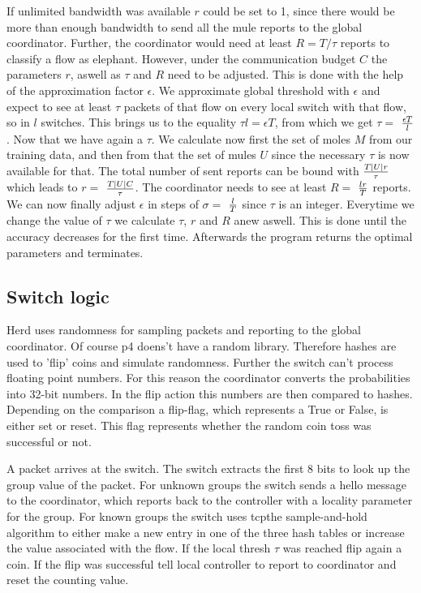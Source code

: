 \documentclass[11pt,oneside,a4paper]{article}
\begin{document}
If unlimited bandwidth was available $r$ could be set to 1, since there would be more than enough bandwidth to send all the mule reports to the global coordinator. Further, the coordinator would need at least $R = T/\tau$ reports to classify a flow as elephant. However, under the communication budget $C$ the parameters $r$, aswell as $\tau$ and $R$ need to be adjusted. This is done with the help of the approximation factor $\epsilon$. We approximate global threshold with $\epsilon$ and expect to see at least $\tau$ packets of that flow on every local switch with that flow, so in $l$ switches. This brings us to the equality $\tau l = \epsilon T$, from which we get $\tau =$ $\epsilon T\over l$. Now that we have again a $\tau$. We calculate now first the set of moles $M$ from our training data, and then from that the set of mules $U$ since the necessary $\tau$ is now available for that. The total number of sent reports can be bound with $T|U|r\over \tau$ which leads to $r =$ $T|U|C\over \tau$. The coordinator needs to see at least $R =$ $lr\over T$ reports. We can now finally adjust $\epsilon$ in steps of $\sigma =$ $l\over T$ since $\tau$ is an integer. Everytime we change the value of $\tau$ we calculate $\tau$, $r$ and $R$ anew aswell. This is done until the accuracy decreases for the first time. Afterwards the program returns the optimal parameters and terminates.

\subsection{Switch logic} \label{switch}
Herd uses randomness for sampling packets and reporting to the global coordinator. Of course p4 doens't have a random library. Therefore hashes are used to 'flip' coins and simulate randomness. Further the switch can't process floating point numbers. For this reason the coordinator converts the probabilities into 32-bit numbers. In the flip action this numbers are then compared to hashes. Depending on the comparison a flip-flag, which represents a True or False, is either set or reset. This flag represents whether the random coin toss was successful or not.

A packet arrives at the switch. The switch extracts the first 8 bits to look up the group value of the packet. For unknown groups the switch sends a hello message to the coordinator, which reports back to the controller with a locality parameter for the group. For known groups the switch uses tcpthe sample-and-hold algorithm to either make a new entry in one of the three hash tables or increase the value associated with the flow. If the local thresh $\tau$ was reached flip again a coin. If the flip was successful tell local controller to report to coordinator and reset the counting value. 
\end{document}
